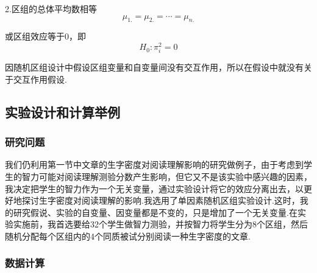 2.区组的总体平均数相等
\[ \mu _{1.} = \mu _{2.} = \cdots = \mu _{n.} \]

或区组效应等于0，即
\[ H_0 : \pi _i ^2 = 0\]

因随机区组设计中假设区组变量和自变量间没有交互作用，所以在假设中就没有关于交互作用假设.

\subsection{实验设计和计算举例}
\subsubsection{研究问题}
我们仍利用第一节中文章的生字密度对阅读理解影响的研究做例子，由于考虑到学生的智力可能对阅读理解测验分数产生影响，但它又不是该实验中感兴趣的因素，我决定把学生的智力作为一个无关变量，通过实验设计将它的效应分离出去，以更好地探讨生字密度对阅读理解的影响.我选用了单因素随机区组实验设计.这时，我的研究假说、实验的自变量、因变量都是不变的，只是增加了一个无关变量.在实验实施前，我首选要给32个学生做智力测验，并按智力将学生分为8个区组，然后随机分配每个区组内的4个同质被试分别阅读一种生字密度的文章.

\subsubsection{数据计算}

